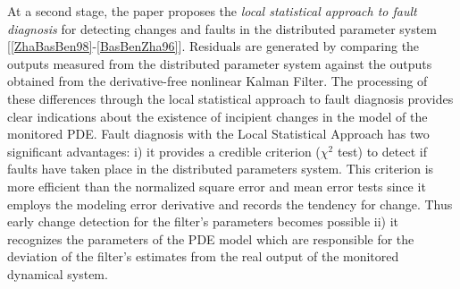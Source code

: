 \documentclass[journal]{IEEEtran}
\begin{document}
\noindent At a second stage, the paper proposes the \textit{local statistical approach to fault diagnosis} for detecting changes and faults in the distributed parameter system  [\ref{ZhaBasBen98}-\ref{BasBenZha96}]. Residuals are generated by comparing the outputs measured from the distributed parameter system against the outputs obtained from the derivative-free nonlinear Kalman Filter. The processing of these differences through the local statistical approach to fault diagnosis provides clear indications about the existence of incipient changes in the model of the monitored PDE. Fault diagnosis with the Local Statistical Approach has two significant advantages: i) it provides a credible criterion ($\chi^2$ test) to detect if faults have taken place in the distributed parameters system. This criterion is more efficient than the normalized square error and mean error tests since it employs the modeling error derivative and records the tendency for change. Thus early change detection for the filter's parameters becomes possible ii) it recognizes the parameters of the PDE model which are responsible for the deviation of the filter's estimates from the real output of the monitored dynamical system.
\end{document}
